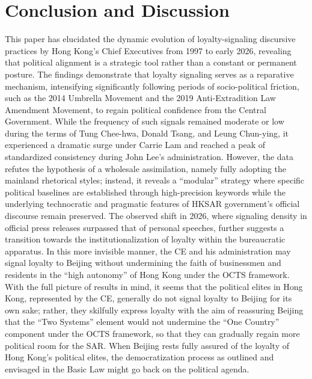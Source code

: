 \documentclass[9pt,a4paper,twocolumn,twoside]{rho-class/rho}
\begin{document}
        
       

\section{Conclusion and Discussion}
    
    This paper has elucidated the dynamic evolution of loyalty-signaling discursive practices by Hong Kong's Chief Executives from 1997 to early 2026, revealing that political 
    alignment is a strategic tool rather than a constant or permanent posture. The findings demonstrate that loyalty signaling serves as a reparative mechanism, intensifying 
    significantly following periods of socio-political friction, such as the 2014 Umbrella Movement and the 2019 Anti-Extradition Law Amendment Movement, to regain political 
    confidence from the Central Government. While the frequency of such signals remained moderate or low during the terms of Tung Chee-hwa, Donald Tsang, and Leung Chun-ying, 
    it experienced a dramatic surge under Carrie Lam and reached a peak of standardized consistency during John Lee's administration. However, the data refutes the hypothesis 
    of a wholesale assimilation, namely fully adopting the mainland rhetorical styles; instead, it reveals a ``modular'' strategy where specific political baselines are established 
    through high-precision keywords while the underlying technocratic and pragmatic features of HKSAR government's official discourse remain preserved. The observed shift in 
    2026, where signaling density in official press releases surpassed that of personal speeches, further suggests a transition towards the institutionalization of loyalty 
    within the bureaucratic apparatus. In this more invisible manner, the CE and his administration may signal loyalty to Beijing without undermining the faith of businessmen 
    and residents in the ``high autonomy'' of Hong Kong under the OCTS framework. With the full picture of results in mind, it seems that the political elites in Hong Kong, 
    represented by the CE, generally do not signal loyalty to Beijing for its own sake; rather, they skilfully express loyalty with the aim of reassuring Beijing that the 
    ``Two Systems'' element would not undermine the ``One Country'' component under the OCTS framework, so that they can gradually regain more political room for the SAR. 
    When Beijing rests fully assured of the loyalty of Hong Kong's political elites, the democratization process as outlined and envisaged in the Basic Law might go back on 
    the political agenda.
\end{document}
